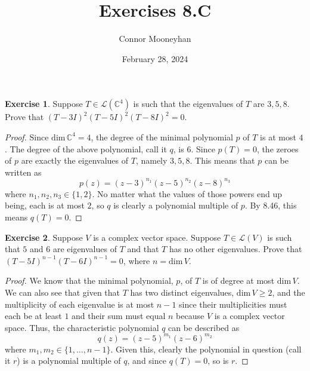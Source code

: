 \documentclass{article}
\title{Exercises 8.C}
\author{Connor Mooneyhan}
\date{February 28, 2024}
\theoremstyle{definition}
\newtheorem{ex}{Exercise}
\begin{document}
\maketitle

\begin{ex}
	Suppose $T \in \mathcal{L}(\mathbb{C}^4)$ is such that the eigenvalues of $T$ are $3, 5, 8$.
	Prove that $(T - 3I)^2(T - 5I)^2(T - 8I)^2 = 0$.
\end{ex}
\begin{proof}
	Since $\mathrm{dim}\,\mathbb{C}^4 = 4$, the degree of the minimal polynomial $p$ of $T$ is at most $4$.
	The degree of the above polynomial, call it $q$, is $6$.
	Since $p(T) = 0$, the zeroes of $p$ are exactly the eigenvalues of $T$, namely $3, 5, 8$.
	This means that $p$ can be written as \begin{equation*}
		p(z) = (z - 3)^{n_1}(z - 5)^{n_2}(z - 8)^{n_3}
	\end{equation*} where $n_1, n_2, n_3 \in \lbrace 1, 2 \rbrace$.
	No matter what the values of those powers end up being, each is at most $2$, so $q$ is clearly a polynomial multiple of $p$.
	By 8.46, this means $q(T) = 0$.
\end{proof}

\begin{ex}
	Suppose $V$ is a complex vector space. Suppose $T \in \mathcal{L}(V)$ is such that $5$ and $6$ are eigenvalues of $T$ and that $T$ has no other eigenvalues. Prove that $(T - 5I)^{n - 1}(T - 6I)^{n - 1} = 0$, where $n = \mathrm{dim}\,V$.
\end{ex}
\begin{proof}
	We know that the minimal polynomial, $p$, of $T$ is of degree at most $\mathrm{dim}\,V$.
	We can also see that given that $T$ has two distinct eigenvalues, $\mathrm{dim}\,V \geq 2$, and the multiplicity of each eigenvalue is at most $n - 1$ since their multiplicities must each be at least $1$ and their sum must equal $n$ because $V$ is a complex vector space.
	Thus, the characteristic polynomial $q$ can be described as \begin{equation*}
		q(z) = (z - 5)^{m_1}(z - 6)^{m_2}
	\end{equation*} where $m_1, m_2 \in \lbrace 1, \dots, n - 1 \rbrace$.
	Given this, clearly the polynomial in question (call it $r$) is a polynomial multiple of $q$, and since $q(T) = 0$, so is $r$.
\end{proof}
\end{document}
